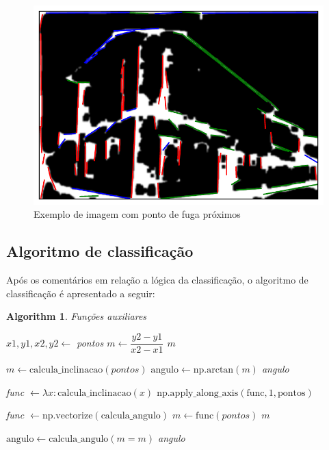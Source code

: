 \documentclass[12pt]{article}
\newtheorem{algorithm}{Algorithm}
\begin{document}
\begin{figure}[H]
    \centering
    \includegraphics[scale=0.60]{inverse.pdf}
    \caption{Exemplo de imagem com ponto de fuga próximos}
    \label{fig:proximos}
\end{figure}

\subsection{Algoritmo de classificação}

Após os comentários em relação a lógica da classificação, o algoritmo de classificação é apresentado a seguir:

\begin{algorithm}
    \small \small \small \small
    \caption{Funções auxiliares}
    \begin{algorithmic}[1]
    
        \State $x1, y1, x2, y2 \gets$ pontos 
        \State $m \gets \dfrac{y2 - y1}{x2 - x1}$
        \State \Return $m$ 
    \EndFunction
    
            \State $m \gets \text{calcula\_inclinacao}(pontos)$
        \EndIf
        \State $\text{angulo} \gets \text{np.arctan}(m)$
        \State \Return angulo
    \EndFunction
    
        \State func $\gets \lambda x: \text{calcula\_inclinacao}(x)$
        \State \Return $\text{np.apply\_along\_axis}(\text{func}, 1, \text{pontos})$
    \EndFunction
    
        \State func $\gets \text{np.vectorize}(\text{calcula\_angulo})$
        \State $m \gets \text{func}(pontos)$
        \State \Return $m$
    \EndFunction
    
        \State $\text{angulo} \gets \text{calcula\_angulo}(m=m)$
        \State \Return angulo
    \EndFunction
\end{algorithmic}
\end{algorithm}
\end{document}

